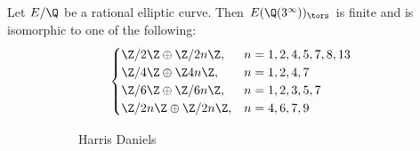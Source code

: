 \begin{frame}[plain]
\begin{thm}
Let $E/\Q$ be a rational elliptic curve. Then $E(\Q(3^\infty))_\tors$ is finite and is isomorphic to one of the following:
	\[
	\begin{cases}
	\Z/2\Z \oplus \Z/2n\Z, & n=1,2,4,5,7,8,13 \\
	\Z/4\Z \oplus \Z4n\Z, & n=1,2,4,7 \\
	\Z/6\Z \oplus \Z/6n\Z, &  n=1,2,3,5,7 \\
	\Z/2n\Z \oplus \Z/2n\Z, & n=4,6,7,9
	\end{cases}
	\]
\end{thm}
	\begin{figure}[h]
	\centering
	\begin{subfigure}{0.20\textwidth}
	\captionsetup{labelformat=empty}
	\centering
	\caption{{\scriptsize Harris Daniels}}
	\end{subfigure}
	\begin{subfigure}{0.325\textwidth}
	\captionsetup{labelformat=empty}
	\centering

\end{subfigure}
\end{figure}
\end{frame}
